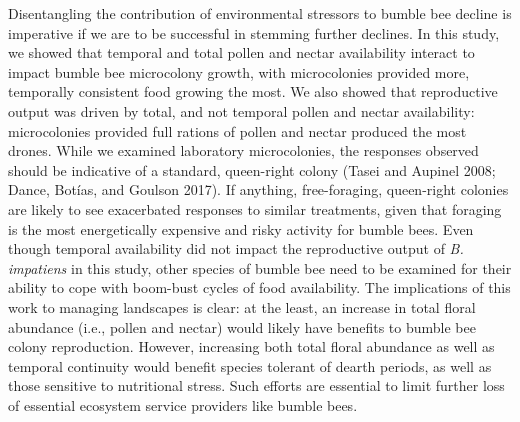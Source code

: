 \documentclass[11pt,]{article}
\begin{document}
Disentangling the contribution of environmental stressors to bumble bee
decline is imperative if we are to be successful in stemming further
declines. In this study, we showed that temporal and total pollen and
nectar availability interact to impact bumble bee microcolony growth,
with microcolonies provided more, temporally consistent food growing the
most. We also showed that reproductive output was driven by total, and
not temporal pollen and nectar availability: microcolonies provided full
rations of pollen and nectar produced the most drones. While we examined
laboratory microcolonies, the responses observed should be indicative of
a standard, queen-right colony (Tasei and Aupinel 2008; Dance, Botías,
and Goulson 2017). If anything, free-foraging, queen-right colonies are
likely to see exacerbated responses to similar treatments, given that
foraging is the most energetically expensive and risky activity for
bumble bees. Even though temporal availability did not impact the
reproductive output of \emph{B. impatiens} in this study, other species
of bumble bee need to be examined for their ability to cope with
boom-bust cycles of food availability. The implications of this work to
managing landscapes is clear: at the least, an increase in total floral
abundance (i.e., pollen and nectar) would likely have benefits to bumble
bee colony reproduction. However, increasing both total floral abundance
as well as temporal continuity would benefit species tolerant of dearth
periods, as well as those sensitive to nutritional stress. Such efforts
are essential to limit further loss of essential ecosystem service
providers like bumble bees.
\end{document}
